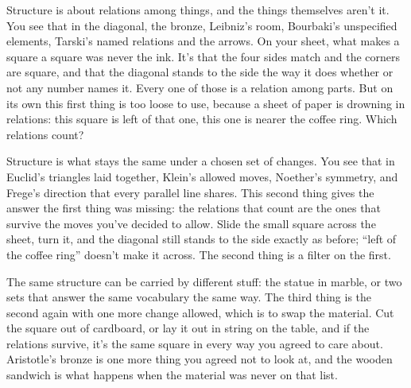 \documentclass[11pt,twoside]{article}
\theoremstyle{thielethm}
\theoremstyle{thieledef}
\theoremstyle{thieledef}
\theoremstyle{thieledef}
\theoremstyle{thielethm}
\theoremstyle{thieleobs}
\theoremstyle{thielethm}
\begin{document}
Structure is about relations among things, and the things themselves aren't it. You see that in the diagonal, the bronze, Leibniz's room, Bourbaki's unspecified elements, Tarski's named relations and the arrows. On your sheet, what makes a square a square was never the ink. It's that the four sides match and the corners are square, and that the diagonal stands to the side the way it does whether or not any number names it. Every one of those is a relation among parts. But on its own this first thing is too loose to use, because a sheet of paper is drowning in relations: this square is left of that one, this one is nearer the coffee ring. Which relations count?

Structure is what stays the same under a chosen set of changes. You see that in Euclid's triangles laid together, Klein's allowed moves, Noether's symmetry, and Frege's direction that every parallel line shares. This second thing gives the answer the first thing was missing: the relations that count are the ones that survive the moves you've decided to allow. Slide the small square across the sheet, turn it, and the diagonal still stands to the side exactly as before; ``left of the coffee ring'' doesn't make it across. The second thing is a filter on the first.

The same structure can be carried by different stuff: the statue in marble, or two sets that answer the same vocabulary the same way. The third thing is the second again with one more change allowed, which is to swap the material. Cut the square out of cardboard, or lay it out in string on the table, and if the relations survive, it's the same square in every way you agreed to care about. Aristotle's bronze is one more thing you agreed not to look at, and the wooden sandwich is what happens when the material was never on that list.
\end{document}
